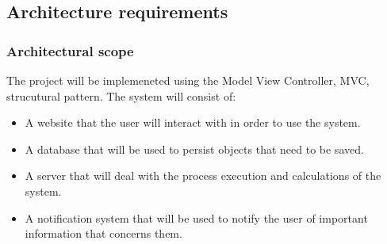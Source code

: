 \documentclass[a4paper,12pt]{article}
\begin{document}
\subsection{Architecture requirements}
\subsubsection{Architectural scope}
The project will be implemeneted using the Model View Controller, MVC, strucutural pattern.
The system will consist of:\begin{itemize}
	\item A website that the user will interact with in order to use the system.
	\item A database that will be used to persist objects that need to be saved.
	\item A server that will deal with the process execution and calculations of the system.
	\item A notification system that will be used to notify the user of important information that concerns them.
\end{itemize}
\end{document}
